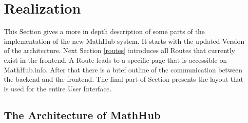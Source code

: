 \documentclass[11pt,a4paper]{article}
\begin{document}
\section{Realization} \label{architecture}
This Section gives a more in depth description of some parts of the implementation of the new MathHub system.
It starts with the updated Version of the architecture.
Next Section \ref{routes} introduces all Routes that currently exist in the frontend.
A Route leads to a specific page that is accessible on MathHub.info.
After that there is a brief outline of the communication between the backend and the frontend. 
The final part of Section presents the layout that is used for the entire User Interface.
\subsection{The Architecture of MathHub}
\end{document}
